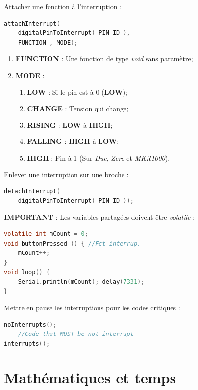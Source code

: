         \bmar
            Attacher une fonction à l'interruption :
        \emar
        \begin{lstlisting}[language=C]
attachInterrupt(
    digitalPinToInterrupt( PIN_ID ),
    FUNCTION , MODE);
        \end{lstlisting}

        \begin{enumerate}
            \item \textbf{FUNCTION} : Une fonction de type \textit{void} sans paramètre;
            \item \textbf{MODE} :
            \begin{enumerate}
                \item \textbf{LOW} : Si le pin est à 0 (\textbf{LOW});
                \item \textbf{CHANGE} : Tension qui change;
                \item \textbf{RISING} : \textbf{LOW} à \textbf{HIGH};
                \item \textbf{FALLING} : \textbf{HIGH} à \textbf{LOW};
                \item \textbf{HIGH} : Pin à 1 (Sur \textit{Due}, \textit{Zero} et \textit{MKR1000}).
            \end{enumerate}
        \end{enumerate}

        \bmar
            Enlever une interruption sur une broche :
        \emar
        \begin{lstlisting}[language=C]
detachInterrupt(
    digitalPinToInterrupt( PIN_ID ));
        \end{lstlisting}

        \bmar
            \textbf{IMPORTANT} : Les variables partagées doivent être \textit{volatile} :
        \emar

        \begin{lstlisting}[language=C]
volatile int mCount = 0;
void buttonPressed () { //Fct interrup.
    mCount++;
}
void loop() {
    Serial.println(mCount); delay(7331);
}
        \end{lstlisting}
        \bmar
            Mettre en pause les interruptions pour les codes critiques :
        \emar
        \begin{lstlisting}[language=C]
noInterrupts();
    //Code that MUST be not interrupt
interrupts();
        \end{lstlisting}
    \section{Mathématiques et temps}
